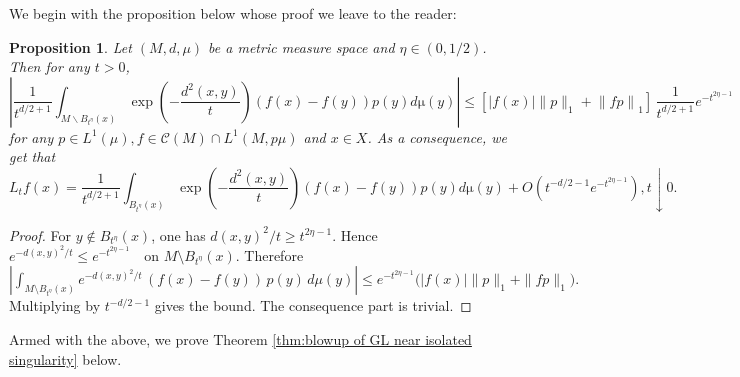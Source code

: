 \documentclass{amsart}
\newtheorem{proposition}[theorem]{Proposition}
\theoremstyle{definition}
\theoremstyle{remark}
\newcommand{\norm}[1]{\left\lVert#1\right\rVert}
\newcommand{\0}{\boldsymbol{0}}
\def\cC{\mathcal C}
\begin{document}
We begin with the proposition below whose proof we leave to the reader:

\begin{proposition}\label{prop:truncation-error}
Let $(M,d,\mu)$ be a metric measure space and $\eta \in (0,1/2)$. Then for any $t>0$,
\[
\left| \frac{1}{t^{d/2+1}} \int_{M\backslash B_{t^\eta }(x)} \exp\left(-\frac{d^2(x,y)}{t}\right) (f(x)-f(y)) p(y)d \mathrm{\mu}(y) \right| 
\leq [|f(x)|\|p\|_{1} + \norm{fp}_{1}] \, \frac{1}{t^{d/2 +1}} e^{-t^{2\eta -1}}
\]
for any $p \in L^1(\mu), f \in \cC(M)\cap L^1(M,p \mu)$ and $x \in X$. As a consequence, we get that
\[
L_tf(x) = \frac{1}{t^{d/2+1}} \int_{B_{t^\eta }(x)} \exp\left(-\frac{d^2(x,y)}{t}\right) (f(x)-f(y)) p(y)d \mathrm{\mu}(y) + O(t^{-d/2-1}e^{-t^{2 \eta -1}}), t \downarrow 0.
\] 
\end{proposition}

\begin{proof}
For $y \notin B_{t^\eta}(x)$, one has $d(x,y)^2/t \ge t^{2\eta-1}$. Hence
\(
e^{-d(x,y)^2/t} \le e^{-t^{2\eta-1}} \quad \text{on } M \setminus B_{t^\eta}(x).
\)
Therefore
\(
\left| \int_{M \setminus B_{t^\eta}(x)} e^{-d(x,y)^2/t}\,(f(x)-f(y))\,p(y)\,d\mu(y) \right|
\le e^{-t^{2\eta-1}} \bigl( |f(x)|\|p\|_1 + \|fp\|_1 \bigr).
\)
Multiplying by $t^{-d/2-1}$ gives the bound. The consequence part is trivial.
\end{proof}


Armed with the above, we prove Theorem \ref{thm:blowup of GL near isolated singularity} below.
\end{document}

